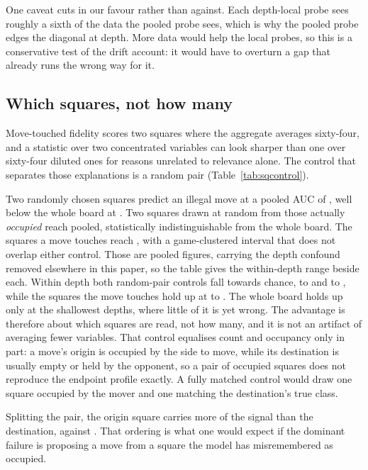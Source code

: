 \documentclass[manuscript, screen, review]{jair}
\theoremstyle{remark}
\begin{document}
One caveat cuts in our favour rather than against. Each depth-local probe sees
roughly a sixth of the data the pooled probe sees, which is why the pooled probe
edges the diagonal at depth. More data would help the local probes, so this is a
conservative test of the drift account: it would have to overturn a gap that
already runs the wrong way for it.

\subsection{Which squares, not how many}
\label{sec:sqcontrol}

Move-touched fidelity scores two squares where the aggregate averages
sixty-four, and a statistic over two concentrated variables can look sharper than
one over sixty-four diluted ones for reasons unrelated to relevance alone. The control
that separates those explanations is a random pair (Table~\ref{tab:sqcontrol}).



Two randomly chosen squares predict an illegal move at a pooled AUC of
, well below the whole board at . Two
squares drawn at random from those actually \emph{occupied} reach
 pooled, statistically indistinguishable from the whole
board. The squares a move touches reach , with a
game-clustered interval that does not overlap either control. Those are pooled figures, carrying the depth
confound removed elsewhere in this paper, so the table gives the within-depth
range beside each. Within depth both random-pair controls fall towards chance,
 to  and
 to , while the squares the
move touches hold up at  to
. The whole board holds up only at the shallowest
depths, where little of it is yet wrong. The advantage is therefore about
which squares are read, not how many, and it is not an artifact of averaging
fewer variables. That control equalises count and occupancy only in part: a
move's origin is occupied by the side to move, while its destination is usually
empty or held by the opponent, so a pair of occupied squares does not reproduce
the endpoint profile exactly. A fully matched control would draw one square
occupied by the mover and one matching the destination's true class.

Splitting the pair, the origin square carries more of the signal than the
destination,  against . That ordering is
what one would expect if the dominant failure is proposing a move from a square
the model has misremembered as occupied.
\end{document}
